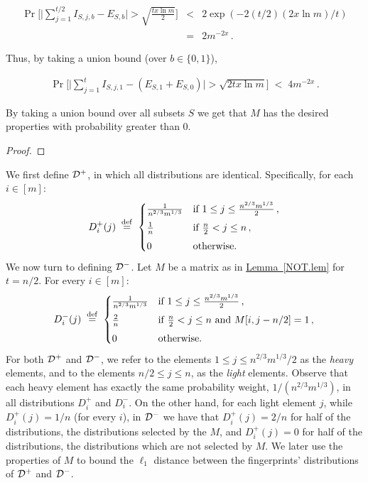 \documentclass[10pt]{article}
\theoremstyle{definition}
\numberwithin{equation}{section}
\newcommand{\expref}[2]{\texorpdfstring{\hyperref[#2]{#1~\ref{#2}}}{#1~\ref{#2}}}
\newcommand{\calD}{{\cal D}}
\newcommand{\eqdef}{\stackrel{\rm def}{=}}
\newcommand{\BEQ}{\begin{equation}} \newcommand{\EEQ}{\end{equation}}
\newcommand{\BEQN}{\begin{eqnarray}}\newcommand{\EEQN}{\end{eqnarray}}
\newcommand{\BPF}{\begin{proof}} \newcommand {\EPF}{\end{proof}}
\newcommand{\bitset}{\{0,1\}}
\begin{document}
{\BEQN
\Pr\Bigg[\Big|\sum_{j=1}^{t/2} I_{S,j,b} - E_{S,b}\Big|
             > \sqrt{\frac{t x\ln m}{2}}\Bigg]
&<& 2\exp(-2(t/2) (2x\ln m)/t)\\
&=& 2m^{-2x}\,.
\EEQN








%
Thus, by taking a union bound (over $b \in \bitset$),
%
%
%






\BEQN
\Pr\Bigg[\Big|\sum_{j=1}^{t} I_{S,j,1} - (E_{S,1}+E_{S,0})\Big| >  \sqrt{2t x\ln m}\Bigg]
\;<\; 4m^{-2x}\,.
\EEQN

By taking a union bound over all subsets $S$
we get that $M$ has the desired properties with probability
greater than $0$.
} %


 \BPF
 \NOTLemPrf
 \EPF


\medskip
We first define $\calD^+$, in which all distributions are identical. Specifically,
for each $i \in [m]$:
\begin{equation}
D_i^+(j) \;\eqdef\;
\begin{cases}
 \frac{1}{n^{2/3}m^{1/3}} & \text{if } 1 \leq j \leq \frac{n^{2/3}m^{1/3}}{2}\,,\\[1ex]
 \frac{1}{n} & \text{if } \frac{n}{2} < j \leq n\,,\\[1ex]  0 & \text{otherwise.}
\end{cases}
\label{Dpl-def.eq}
\end{equation}
We now turn to defining $\calD^-$.
Let $M$ be a matrix as in \expref{Lemma}{NOT.lem} for $t=n/2$.
For every $i \in [m]$:
%
\BEQ
D_i^-(j) \;\eqdef\;
\begin{cases}  \frac{1}{n^{2/3}m^{1/3}} & \text{if } 1 \leq j \leq
        \frac{n^{2/3}m^{1/3}}{2}\,,\\[1ex]
       \frac{2}{n} & \text{if } \frac{n}{2} < j \leq n \text{ and }M[i,j-n/2]=1\,,\\[1ex]  0 & \text{otherwise.}\end{cases}
\label{Dmi-def.eq}
\EEQ
%
%
For both $\calD^+$ and $\calD^-$, we refer to the elements
$1 \leq j \leq {n^{2/3}m^{1/3}}/{2}$ as the \emph{heavy} elements,
and to the elements ${n}/{2} \leq j \leq n$, as the \emph{light} elements.
Observe that each heavy element has exactly the same probability weight,
${1}/{(n^{2/3}m^{1/3})}$, in all distributions $D_i^+$ and $D_i^-$.
On the other hand, for each light element $j$, while $D_i^+(j) = {1}/{n}$
(for every $i$), in $\calD^-$ we have that $D_i^+(j) = {2}/{n}$
for half of the distributions, the distributions selected by the $M$, and $D_i^+(j) = 0$ for half of the distributions, the distributions which are not selected by $M$. We later use the properties of $M$ to bound the $\ell_1$ distance between the fingerprints' distributions of $\calD^+$ and $\calD^-$.
\end{document}
